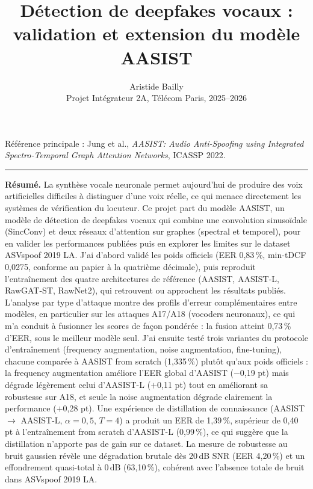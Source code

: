 \documentclass[10pt, a4paper]{article}
\title{\textbf{Détection de deepfakes vocaux : validation et extension du modèle AASIST}}
\author{Aristide Bailly\\Projet Intégrateur 2A, Télécom Paris, 2025--2026}
\date{}
\begin{document}
\maketitle

\noindent Référence principale : Jung et al., \textit{AASIST: Audio Anti-Spoofing using Integrated Spectro-Temporal Graph Attention Networks}, ICASSP 2022.

\hrule
\vspace{1em}

\noindent\textbf{Résumé.} La synthèse vocale neuronale permet aujourd'hui de produire des voix artificielles difficiles à distinguer d'une voix réelle, ce qui menace directement les systèmes de vérification du locuteur. Ce projet part du modèle AASIST, un modèle de détection de deepfakes vocaux qui combine une convolution sinusoïdale (SincConv) et deux réseaux d'attention sur graphes (spectral et temporel), pour en valider les performances publiées puis en explorer les limites sur le dataset ASVspoof 2019 LA. J'ai d'abord validé les poids officiels (EER 0,83\,\%, min-tDCF 0,0275, conforme au papier à la quatrième décimale), puis reproduit l'entraînement des quatre architectures de référence (AASIST, AASIST-L, RawGAT-ST, RawNet2), qui retrouvent ou approchent les résultats publiés. L'analyse par type d'attaque montre des profils d'erreur complémentaires entre modèles, en particulier sur les attaques A17/A18 (vocoders neuronaux), ce qui m'a conduit à fusionner les scores de façon pondérée : la fusion atteint 0,73\,\% d'EER, sous le meilleur modèle seul. J'ai ensuite testé trois variantes du protocole d'entraînement (frequency augmentation, noise augmentation, fine-tuning), chacune comparée à AASIST from scratch (1,335\,\%) plutôt qu'aux poids officiels : la frequency augmentation améliore l'EER global d'AASIST ($-$0,19 pt) mais dégrade légèrement celui d'AASIST-L ($+$0,11 pt) tout en améliorant sa robustesse sur A18, et seule la noise augmentation dégrade clairement la performance ($+$0,28 pt). Une expérience de distillation de connaissance (AASIST $\rightarrow$ AASIST-L, $\alpha=0{,}5$, $T=4$) a produit un EER de 1,39\,\%, supérieur de 0,40 pt à l'entraînement from scratch d'AASIST-L (0,99\,\%), ce qui suggère que la distillation n'apporte pas de gain sur ce dataset. La mesure de robustesse au bruit gaussien révèle une dégradation brutale dès 20\,dB SNR (EER 4,20\,\%) et un effondrement quasi-total à 0\,dB (63,10\,\%), cohérent avec l'absence totale de bruit dans ASVspoof 2019 LA.
\end{document}
